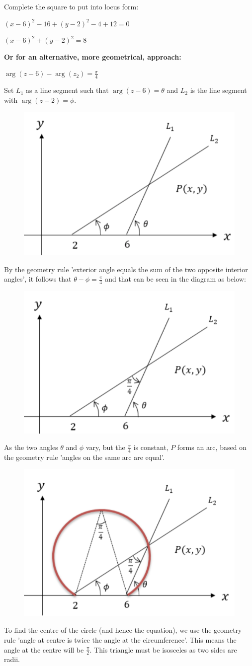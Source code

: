 \documentclass[../main.tex]{subfiles}
\begin{document}
\begin{enumerate}[itemsep=1cm]
    Complete the square to put into locus form:

    $(x-6)^2-16+(y-2)^2-4+12=0$

    $(x-6)^2+(y-2)^2=8$
    
    \textbf{Or for an alternative, more geometrical, approach:}

    \(\arg{(z-6)}-\arg{(z_2)}=\frac{\pi}{4}\)

    Set $L_1$ as a line segment such that $\arg{(z-6)}=\theta$ and $L_2$ is the line segment with $\arg{(z-2)=\phi}$.

    \begin{figure}[h]
        \centering
        \includegraphics[width=0.25\linewidth]{images/t2w8q3a1.png}
    \end{figure}

    By the geometry rule 'exterior angle equals the sum of the two opposite interior angles', it follows that $\theta - \phi = \frac{\pi}{4}$ and that can be seen in the diagram as below:

    \begin{figure}[h]
        \centering
        \includegraphics[width=0.25\linewidth]{images/t2w8q3a2.png}
    \end{figure}

    As the two angles $\theta$ and $\phi$ vary, but the $\frac{\pi}{4}$ is constant, $P$ forms an arc, based on the geometry rule 'angles on the same arc are equal'.

    \begin{figure}[h]
        \centering
        \includegraphics[width=0.25\linewidth]{images/t2w8q3a3.png}
    \end{figure}

    To find the centre of the circle (and hence the equation), we use the geometry rule 'angle at centre is twice the angle at the circumference'. This means the angle at the centre will be $\frac{\pi}{2}$. This triangle must be isosceles as two sides are radii.


\end{enumerate}
\end{document}

